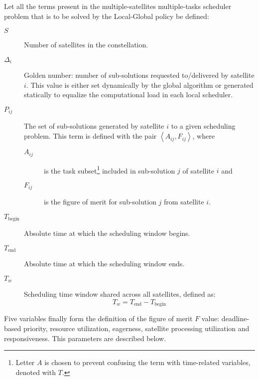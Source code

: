 Let all the terms present in the multiple-satellites multiple-tasks scheduler problem that is to be solved by the Local-Global policy be defined:

\begin{description}
\item[$S$] Number of satellites in the constellation.
\item[$\Delta_i$] Golden number: number of sub-solutions requested to/delivered by satellite $i$. This value is either set dynamically by the global algorithm or generated statically to equalize the computational load in each local scheduler.
\item[$P_{ij}$] The set of sub-solutions generated by satellite $i$ to a given scheduling problem. This term is defined with the pair $\left\langle A_{ij}, F_{ij}\right\rangle$, where
\begin{description}
\item[$A_{ij}$] is the task subset\footnote{Letter $A$ is chosen to prevent confusing the term with time-related variables, denoted with $T$.} included in sub-solution $j$ of satellite $i$ and
\item[$F_{ij}$] is the figure of merit for sub-solution $j$ from satellite $i$.
\end{description}
\item[$T_\text{begin}$] Absolute time at which the scheduling window begins. 
\item[$T_\text{end}$] Absolute time at which the scheduling window ends.
\item[$T_w$] Scheduling time window shared across all satellites, defined as:
\begin{equation}
T_w = T_\text{end} - T_\text{begin}
\end{equation}
\end{description}

Five variables finally form the definition of the figure of merit $F$ value: deadline-based priority, resource utilization, eagerness, satellite processing utilization and responsiveness. This parameters are described below.

